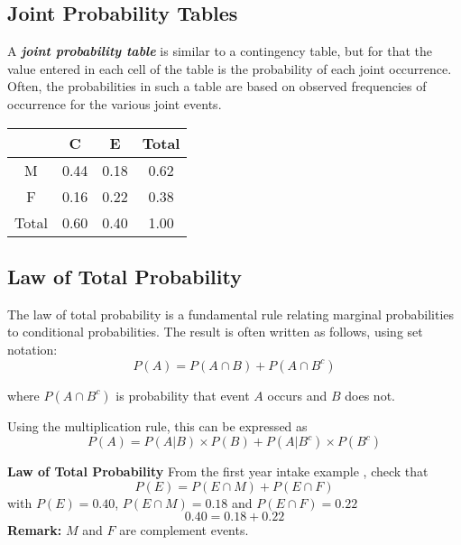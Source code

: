 \documentclass[]{report}
\begin{document}
{
	\subsection{Joint Probability Tables}
	
	A \textbf{\emph{joint probability table}} is similar to a contingency table, but for that the value entered in
	each cell of the table is the probability of each joint occurrence. Often, the probabilities in such a table are based
	on observed frequencies of occurrence for the various joint events.
	\begin{center}
		\begin{tabular}{|c||c|c||c|}
			\hline
			& C & E & Total \\ \hline \hline
			M & 0.44 & 0.18 & 0.62 \\ \hline
			F & 0.16 & 0.22 & 0.38 \\ \hline \hline
			Total & 0.60 & 0.40 & 1.00 \\ \hline
		\end{tabular}
	\end{center}

	\subsection{Law of Total Probability}
	The law of total probability is a fundamental rule relating marginal probabilities to conditional probabilities. The result is often written as follows, using set notation:
	\[ P(A)  = P(A \cap B) + P(A \cap B^c) \]
	
	where $P(A \cap B^c)$ is probability that event $A$ occurs and $B$ does not.\\ \bigskip
	
	
	Using the multiplication rule, this can be expressed as
	\[ P(A) = P(A | B)\times P(B) + P(A | B^{c})\times P(B^{c}) \]
	
	{
		\noindent \textbf{Law of Total Probability}
		From the first year intake example , check that
		\[ P(E)  = P(E \cap M) + P(E \cap F) \]
		with $ P(E) = 0.40$, $ P(E \cap M) = 0.18$ and  $ P(E \cap F) = 0.22$
		\[ 0.40  = 0.18 + 0.22 \]
		\textbf{Remark:}  $M$ and $F$ are complement events.
		
		

}}
\end{document}
